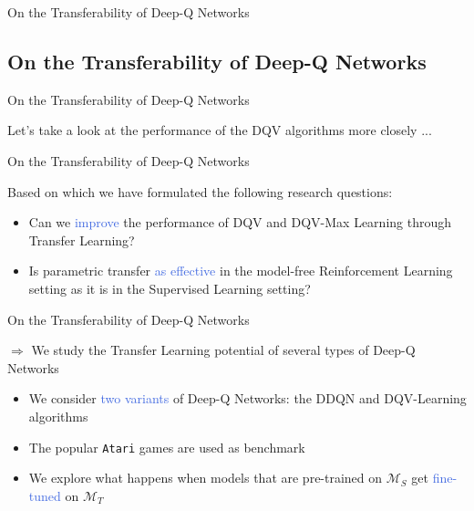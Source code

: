 \documentclass{beamer}
\begin{document}
\begin{frame}{On the Transferability of Deep-Q Networks}
	\subsection{On the Transferability of Deep-Q Networks}

\end{frame}

\begin{frame}{On the Transferability of Deep-Q Networks}
	
	Let's take a look at the performance of the DQV algorithms more closely ...
	
	\bigskip
	

\end{frame}


\begin{frame}{On the Transferability of Deep-Q Networks}

	Based on which we have formulated the following research questions:

	\begin{itemize}
		\item Can we \textcolor{RoyalBlue}{improve} the performance of DQV and DQV-Max Learning through Transfer Learning?
		\item Is parametric transfer \textcolor{RoyalBlue}{as effective} in the model-free Reinforcement Learning setting as it is in the Supervised Learning setting?
	\end{itemize}
	
\end{frame}

\begin{frame}{On the Transferability of Deep-Q Networks}

	$\Rightarrow$ We study the Transfer Learning potential of several types of Deep-Q Networks

	\begin{itemize}
		\item We consider \textcolor{RoyalBlue}{two variants} of Deep-Q Networks: the DDQN and DQV-Learning algorithms
		\item The popular \texttt{Atari} games are used as benchmark
		\item We explore what happens when models that are pre-trained on $\mathcal{M}_S$ get \textcolor{RoyalBlue}{fine-tuned} on $\mathcal{M}_T$
	\end{itemize}

\end{frame}
\end{document}
